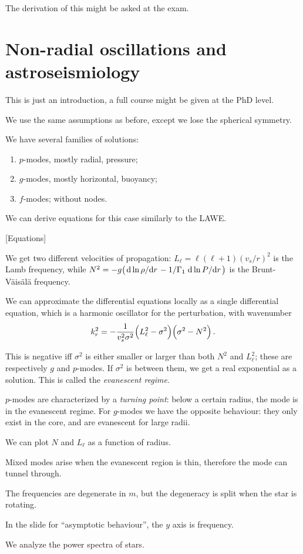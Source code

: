 \documentclass[main.tex]{subfiles}
\begin{document}
The derivation of this might be asked at the exam.

\section{Non-radial oscillations and astroseismiology}

This is just an introduction, a full course might be given at the PhD level.

We use the same assumptions as before, except we lose the spherical symmetry.

We have several families of solutions: 

\begin{enumerate}
    \item \(p\)-modes, mostly radial, pressure;
    \item \(g\)-modes, mostly horizontal, buoyancy;
    \item \(f\)-modes; without nodes.
\end{enumerate}

We can derive equations for this case similarly to the LAWE.

[Equations]

We get two different velocities of propagation: \(L_{\ell} = \ell (\ell + 1) (v_s / r)^2\) is the Lamb frequency, while \(N^2= -g \qty(\dv*{\ln \rho }{r} - 1/\Gamma_1 \dv*{\ln P }{r} )\) is the Brunt-Väisälä frequency.

We can approximate the differential equations locally as a single differential equation, which is a harmonic oscillator for the perturbation, with wavenumber
%
\begin{equation}
  k^2_r = - \frac{1}{v_s^2 \sigma^2 } \qty(L_\ell^2- \sigma^2   ) \qty(\sigma^2 - N^2)
\,.
\end{equation}

This is negative iff \(\sigma^2\) is either smaller or larger than both \(N^2\) and \(L_\ell^2\); these are respectively \(g\) and \(p\)-modes. If \(\sigma^2\) is between them, we get a real exponential as a solution.
This is called the \emph{evanescent regime}.

\(p\)-modes are characterized by a \emph{turning point}: below a certain radius, the mode is in the evanescent regime.
For \(g\)-modes we have the opposite behaviour: they only exist in the core, and are evanescent for large radii. 

We can plot \(N\) and \(L_\ell\) as a function of radius.

Mixed modes arise when the evanescent region is thin, therefore the mode can tunnel through.

The frequencies are degenerate in \(m\), but the degeneracy is split when the star is rotating.

In the slide for ``asymptotic behaviour'', the \(y\) axis is frequency.

We analyze the power spectra of stars.
\end{document}
